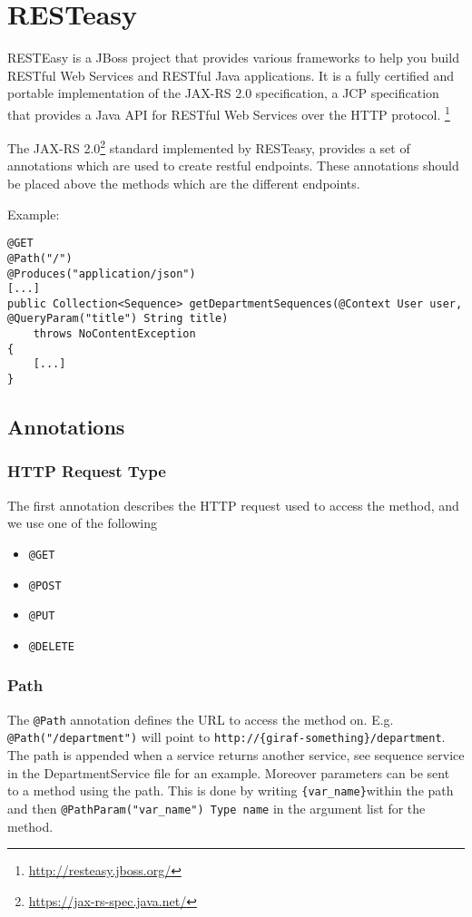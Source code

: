 \chapter{RESTeasy}\label{app:resteasy}
\begin{displayquote}
RESTEasy is a JBoss project that provides various frameworks to help you build RESTful Web Services and RESTful Java applications.
It is a fully certified and portable implementation of the JAX-RS 2.0 specification, a JCP specification that provides a Java API for RESTful Web Services over the HTTP protocol.
\footnote{\url{http://resteasy.jboss.org/}}
\end{displayquote}

The JAX-RS 2.0\footnote{\url{https://jax-rs-spec.java.net/}} standard implemented by RESTeasy, provides a set of annotations which are used to create restful endpoints. These annotations should be placed above the methods which are the different endpoints.

\bigskip\noindent
Example:
\begin{lstlisting}[style=Java]
@GET
@Path("/")
@Produces("application/json")
[...]
public Collection<Sequence> getDepartmentSequences(@Context User user, @QueryParam("title") String title)
    throws NoContentException
{
    [...]
}
\end{lstlisting}

\section{Annotations}

\subsection{HTTP Request Type}
The first annotation describes the HTTP request used to access the method, and we use one of the following
\begin{itemize}
    \item \texttt{@GET}
    \item \texttt{@POST}
    \item \texttt{@PUT}
    \item \texttt{@DELETE}
\end{itemize}

\subsection{Path}
The \texttt{@Path} annotation defines the URL to access the method on. E.g. \texttt{@Path("/department")} will point to \texttt{http://\{giraf-something\}/department}.
The path is appended when a service returns another service, see sequence service in the DepartmentService file for an example.
Moreover parameters can be sent to a method using the path. This is done by writing \texttt{\{var\_name\}}within the path and then \texttt{@PathParam("var\_name") Type name} in the argument list for the method.

